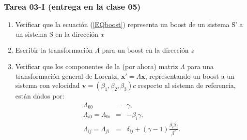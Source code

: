 \documentclass[xetex,mathserif,serif,10pt]{beamer}
\begin{document}
\begin{frame}
  \frametitle{\alert{Tarea 03-I (entrega en la clase 05)}}
  \begin{enumerate}
    \item Verificar que la ecuación (\ref{EQboost}) representa un boost de un sistema S' a un sistema S en la dirección $x$
    \item Escribir la transformación $\Lambda$ para un boost en la dirección $z$
    \item Verificar que los componentes de la (por ahora) matriz $\Lambda$ para una transformación general de Lorentz, $\mathbf{x'}=\Lambda \mathbf{x}$, representando un boost a un sistema con velocidad $\mathbf{v}=(\beta_1, \beta_2, \beta_3) c$ respecto al sistema de referencia, están dados por:
    \begin{eqnarray*}
      \Lambda_{00} &=& \gamma,\\
      \Lambda_{i0}=\Lambda_{0i} &=& -\beta_i \gamma,\\
      \Lambda_{ij}=\Lambda_{ji} &=& \delta_{ij} + (\gamma - 1) \frac{\beta_i \beta_j}{\beta^2}.
    \end{eqnarray*}
  \end{enumerate}
\end{frame}
\end{document}
